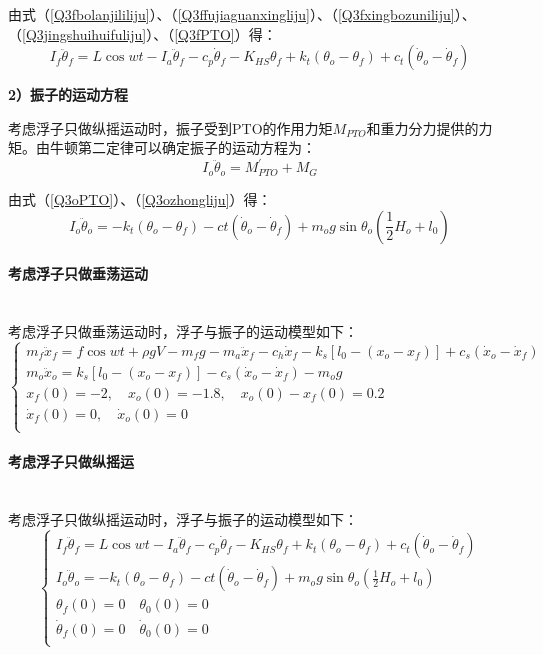 \documentclass{my_paper}
\newcommand{\subsubsubsection}[1]{\paragraph{#1}\mbox{}\\}
\begin{document}
    由式（\ref{Q3fbolanjililiju}）、（\ref{Q3ffujiaguanxingliju}）、（\ref{Q3fxingbozuniliju}）、（\ref{Q3jingshuihuifuliju}）、（\ref{Q3fPTO}）得：
    \begin{equation}
      I_f\ddot \theta_{f}=L\cos wt -I_a\ddot \theta_{f}-c_p\dot \theta_{f}-K_{HS}\theta_{f}+k_t(\theta_{o}-\theta_{f})+c_t(\dot\theta_{o}-\dot\theta_{f})
    \end{equation}
    
    \textbf{2）振子的运动方程}
    
    考虑浮子只做纵摇运动时，振子受到PTO的作用力矩$M_{PTO}$和重力分力提供的力矩。由牛顿第二定律可以确定振子的运动方程为：
    \begin{equation}
        I_{o} \ddot \theta_{o} = M_{PTO}^{'}+M_{G}
    \end{equation}
    
    由式（\ref{Q3oPTO}）、（\ref{Q3ozhongliju}）得：
    \begin{equation}
        I_o\ddot\theta_{o}=-k_t(\theta_o-\theta_f)-ct(\dot\theta_o-\dot\theta_f)+m_og\sin \theta_{o}(\frac{1}{2}H_o+l_0)        
    \end{equation}

\subsubsubsection{考虑浮子只做垂荡运动}

    考虑浮子只做垂荡运动时，浮子与振子的运动模型如下：
    \begin{equation}
        \left\{\begin{matrix} 
            m_f\ddot x_f=f \cos wt+\rho g V-m_f g-m_{a}\ddot x_f-c_h \dot x_{f}-k_s[l_{0}-(x_{o}-x_{f})]+c_{s}(\dot x_{o}-\dot x_{f}) \\ 
           m_{o}\ddot x_{o}= k_{s}[l_{0}-(x_{o}-x_{f})]-c_{s}(\dot x_{o}-\dot x_{f})-m_{o}g\\  
            x_f(0)=-2, \quad x_{o}(0)=-1.8, \quad x_{o}(0)-x_{f}(0)=0.2\\
            \dot x_f(0)=0, \quad \dot x_o(0)=0\\
        \end{matrix}\right.    
    \end{equation}
    
\subsubsubsection{考虑浮子只做纵摇运}

    考虑浮子只做纵摇运动时，浮子与振子的运动模型如下：
    \begin{equation}
    \left\{\begin{matrix}
        I_f\ddot\theta_{f}=L\cos wt -I_a\ddot\theta_{f}-c_p\dot\theta_{f}-K_{HS}\theta_{f}+k_t(\theta_{o}-
    \theta_{f})+c_t(\dot\theta_{o}-\dot\theta_{f})\\
    I_o\ddot\theta_{o}=-k_t(\theta_o-\theta_f)-ct(\dot\theta_o-\dot\theta_f)+m_og\sin \theta_{o}(\frac{1}{2}H_o+l_0)\\
    \theta_{f} (0)=0 \quad \theta_{0}(0)=0\\
    \dot\theta_{f} (0)=0 \quad \dot\theta_{0}(0)=0\\
    
    \end{matrix}\right.
    \end{equation}
\end{document}
